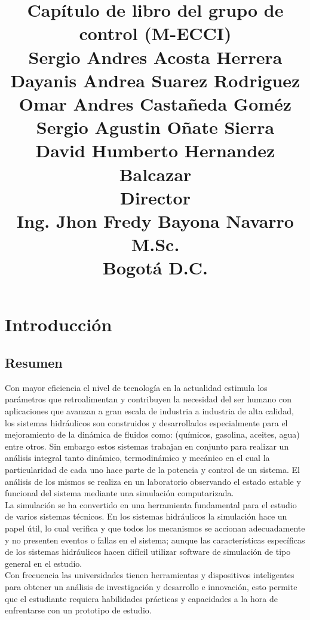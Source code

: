 \documentclass[a4paper,12pt,twoside]{proyectotanquesecci}
\title
{
\textbf{Capítulo de libro del grupo de control (M-ECCI)}\\
\vspace{3cm}
{\large 
Sergio Andres Acosta Herrera \\
Dayanis Andrea Suarez Rodriguez\\
Omar Andres Castañeda Goméz\\
Sergio Agustin Oñate Sierra\\
David Humberto Hernandez Balcazar\\}
\vspace{1cm}
\textbf{Director}\\
{\large Ing. Jhon Fredy Bayona Navarro M.Sc.}\\
\vspace{2cm}
{\large Bogotá D.C.}
}
\begin{document}
\maketitle
\renewcommand{\contentsname}{Tabla de Contenido}
\renewcommand{\listtablename}{Lista de Tablas}
\renewcommand{\listfigurename}{Lista de Figuras}
\tableofcontents
\listoftables
\listoffigures




\chapter{Introducción}

\section{Resumen}

Con mayor eficiencia el nivel de tecnología en la actualidad estimula los parámetros que retroalimentan y contribuyen la necesidad del ser humano con aplicaciones que avanzan a gran escala de industria a industria de alta calidad,  los sistemas hidráulicos son construidos y desarrollados especialmente para el mejoramiento de la dinámica de fluidos como: (químicos, gasolina, aceites, agua)  entre otros. Sin embargo estos sistemas trabajan en conjunto para realizar un análisis integral tanto dinámico, termodinámico y mecánico en el cual la particularidad de cada uno hace parte de la potencia y control de un sistema. El análisis de los mismos se realiza en un laboratorio observando el estado estable y funcional del sistema mediante una simulación computarizada.\\

La simulación se ha convertido en una herramienta fundamental para el estudio de varios sistemas técnicos. En los sistemas hidráulicos la simulación hace un papel útil, lo cual verifica y que todos los mecanismos se accionan adecuadamente y no presenten eventos o fallas en el sistema; aunque las características específicas de los sistemas hidráulicos hacen difícil utilizar software de simulación de tipo general en el estudio.\\

Con frecuencia las universidades tienen herramientas y dispositivos inteligentes para obtener un análisis de investigación y desarrollo e innovación, esto permite que el estudiante requiera habilidades prácticas y capacidades a la hora de enfrentarse con un prototipo de estudio.\\
\end{document}
